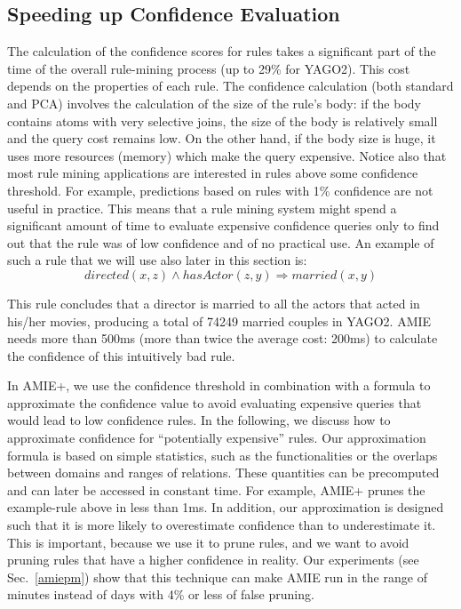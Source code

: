 \subsection{Speeding up Confidence Evaluation}
\label{subsec:speedingConfidenceEvaluation}
The calculation of the confidence scores for rules takes a significant part of the time 
of the overall rule-mining process (up to 29\% for YAGO2). 
This cost depends on the properties of each rule. The confidence calculation (both standard and PCA) involves the calculation of the 
size of the rule's body: if the body contains atoms with very selective joins, the size of the body is relatively small and the query cost remains low. 
On the other hand, if the body size is huge, it uses more resources (memory) which make the query expensive.
Notice also that most rule mining applications are interested in rules above some confidence threshold.
For example, predictions based on rules with 1\% confidence are not useful in practice.
This means that  a rule mining system might spend a significant amount of time to evaluate expensive confidence queries only to find out that
the rule was of low confidence and of no practical use.
An example of such a rule that we will use also later in this section is:
\[
  directed(x,z) \wedge hasActor(z,y) \Rightarrow married(x,y)
\]


This rule concludes that a director is married to all the actors that acted in his/her movies, producing a total of 74249 married couples in YAGO2.
AMIE needs more than 500ms (more than twice the average cost: 200ms) to calculate the confidence of this intuitively bad rule.

In AMIE+, we use the confidence threshold in combination with a formula to approximate the confidence value 
to avoid evaluating expensive queries that would lead to low confidence rules.
In the following, we discuss how to approximate confidence  for ``potentially expensive'' rules. 
Our approximation formula is based on simple statistics, such as the functionalities or the overlaps 
between domains and ranges of relations. 
These quantities
can be precomputed and can later be accessed in constant time. For example, AMIE+ prunes the example-rule above in less than 1ms.  
In addition, our approximation is designed such that it is more likely to overestimate confidence than to underestimate it.
This is important, because we use it to prune rules, and we want to avoid pruning rules that have a higher confidence in reality.
Our experiments (see Sec.~\ref{amiepm}) show that this technique can make AMIE run in the range of minutes instead of days with 4\% or less of false pruning.



